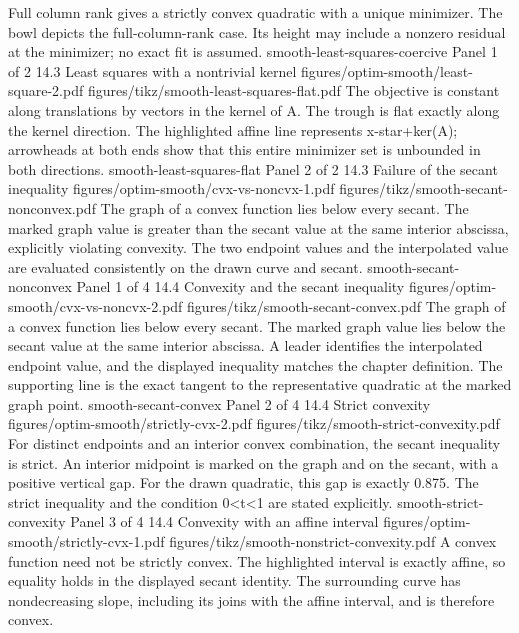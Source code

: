 {Full column rank gives a strictly convex quadratic with a unique minimizer.}
{The bowl depicts the full-column-rank case. Its height may include a nonzero residual at the minimizer; no exact fit is assumed.}
{smooth-least-squares-coercive}
{Panel 1 of 2}
{14.3}
{Least squares with a nontrivial kernel}
{figures/optim-smooth/least-square-2.pdf}
{figures/tikz/smooth-least-squares-flat.pdf}
{The objective is constant along translations by vectors in the kernel of A.}
{The trough is flat exactly along the kernel direction. The highlighted affine line represents x-star+ker(A); arrowheads at both ends show that this entire minimizer set is unbounded in both directions.}
{smooth-least-squares-flat}
{Panel 2 of 2}
{14.3}
{Failure of the secant inequality}
{figures/optim-smooth/cvx-vs-noncvx-1.pdf}
{figures/tikz/smooth-secant-nonconvex.pdf}
{The graph of a convex function lies below every secant.}
{The marked graph value is greater than the secant value at the same interior abscissa, explicitly violating convexity. The two endpoint values and the interpolated value are evaluated consistently on the drawn curve and secant.}
{smooth-secant-nonconvex}
{Panel 1 of 4}
{14.4}
{Convexity and the secant inequality}
{figures/optim-smooth/cvx-vs-noncvx-2.pdf}
{figures/tikz/smooth-secant-convex.pdf}
{The graph of a convex function lies below every secant.}
{The marked graph value lies below the secant value at the same interior abscissa. A leader identifies the interpolated endpoint value, and the displayed inequality matches the chapter definition. The supporting line is the exact tangent to the representative quadratic at the marked graph point.}
{smooth-secant-convex}
{Panel 2 of 4}
{14.4}
{Strict convexity}
{figures/optim-smooth/strictly-cvx-2.pdf}
{figures/tikz/smooth-strict-convexity.pdf}
{For distinct endpoints and an interior convex combination, the secant inequality is strict.}
{An interior midpoint is marked on the graph and on the secant, with a positive vertical gap. For the drawn quadratic, this gap is exactly 0.875. The strict inequality and the condition 0<t<1 are stated explicitly.}
{smooth-strict-convexity}
{Panel 3 of 4}
{14.4}
{Convexity with an affine interval}
{figures/optim-smooth/strictly-cvx-1.pdf}
{figures/tikz/smooth-nonstrict-convexity.pdf}
{A convex function need not be strictly convex.}
{The highlighted interval is exactly affine, so equality holds in the displayed secant identity. The surrounding curve has nondecreasing slope, including its joins with the affine interval, and is therefore convex.}
